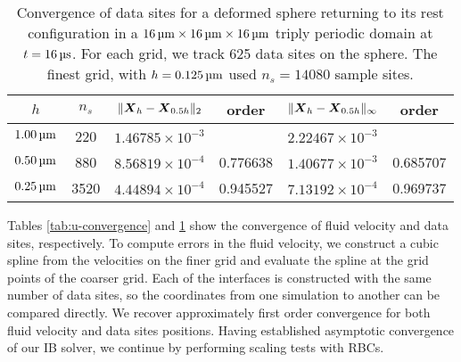 \begin{table}
    \begin{center}
        \begingroup
        \setlength{\tabcolsep}{9pt}
        \renewcommand{\arraystretch}{1.5}
        \begin{tabular}{cc|cc|cc}
                                                                                                             \\ \toprule
            $h$       & $n_s$ & $\|\boldsymbol{X}_h-\boldsymbol{X}_{0.5h}\|_2$ & order    & $\|\boldsymbol{X}_h-\boldsymbol{X}_{0.5h}\|_{\infty}$ & order    \\ \midrule
            $1.00\um$ & 220   & $1.46785\times10^{-3}$ &          & $2.22467\times10^{-3}$        &          \\
            $0.50\um$ & 880   & $8.56819\times10^{-4}$ & 0.776638 & $1.40677\times10^{-3}$        & 0.685707 \\
            $0.25\um$ & 3520  & $4.44894\times10^{-4}$ & 0.945527 & $7.13192\times10^{-4}$        & 0.969737 \\ \bottomrule
        \end{tabular}
        \endgroup
    \end{center}
    \caption{%
Convergence of data sites for a deformed sphere returning to its rest
configuration in a $16\um\times16\um\times16\um$ triply periodic domain at
$t=16\us$. For each grid, we track 625 data sites on the sphere. The finest
grid, with $h = 0.125\um$ used $n_s=14080$ sample sites.
    }
    \label{tab:x-convergence}
\end{table}

Tables \ref{tab:u-convergence} and \ref{tab:x-convergence} show the convergence
of fluid velocity and data sites, respectively. To compute errors in the fluid
velocity, we construct a cubic spline from the velocities on the finer grid
and evaluate the spline at the grid points of the coarser grid. Each of the
interfaces is constructed with the same number of data sites, so the
coordinates from one simulation to another can be compared directly. We recover
approximately first order convergence for both fluid velocity and data sites
positions. Having established asymptotic convergence of our IB solver, we
continue by performing scaling tests with RBCs.

